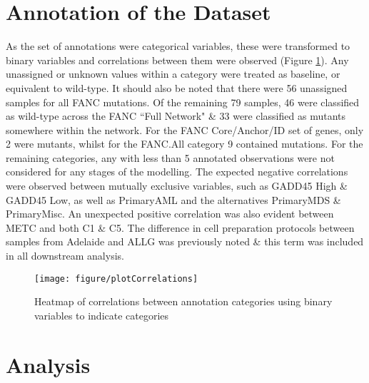 \documentclass{article}\usepackage{knitr}
\begin{document}
\clearpage
\section{Annotation of the Dataset}


As the set of annotations were categorical variables, these were transformed to binary variables and correlations between them were observed (Figure \ref{fig:plotCorrelations}). 
Any unassigned or unknown values within a category were treated as baseline, or equivalent to wild-type.
It should also be noted that there were 56 unassigned samples for all FANC mutations.
Of the remaining 79 samples, 46 were classified as wild-type across the FANC ``Full Network" \& 33 were classified as mutants somewhere within the network.
For the FANC Core/Anchor/ID set of genes, only 2 were mutants, whilst for the FANC.All category 9 contained mutations.
For the remaining categories, any with less than 5 annotated observations were not considered for any stages of the modelling. 
The expected negative correlations were observed between mutually exclusive variables, such as GADD45 High \& GADD45 Low, as well as PrimaryAML and the alternatives PrimaryMDS \& PrimaryMisc. 
An unexpected positive correlation was also evident between METC and both C1 \& C5.
The difference in cell preparation protocols between samples from Adelaide and ALLG was previously noted \& this term was included in all downstream analysis.

\begin{knitrout}
\color{fgcolor}\begin{figure}[]


{\centering \texttt{[image: figure/plotCorrelations]} 

}

\caption[Heatmap of correlations between annotation categories using binary variables to indicate categories]{Heatmap of correlations between annotation categories using binary variables to indicate categories\label{fig:plotCorrelations}}
\end{figure}


\end{knitrout}

\clearpage
\section{Analysis}
\label{FullAnalysis}

\end{document}
